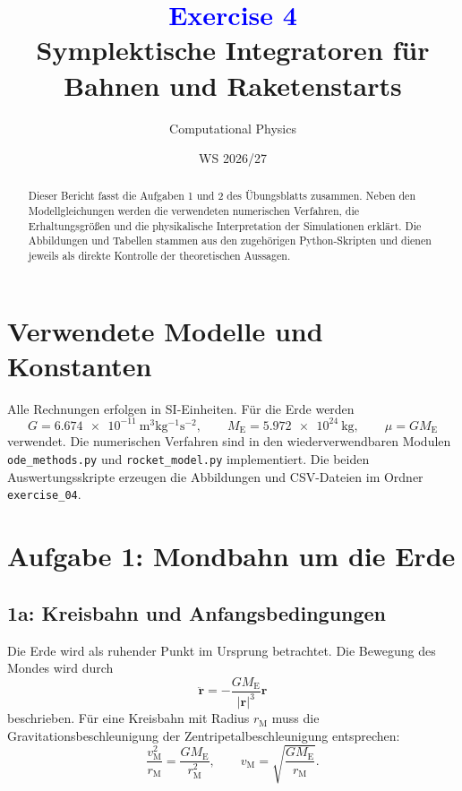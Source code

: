\documentclass[11pt,a4paper]{article}
\title{\textcolor{blue}{Exercise 4}\\[0.35em]
\large Symplektische Integratoren für Bahnen und Raketenstarts}
\author{Computational Physics}
\date{WS 2026/27}
\newcommand{\vect}[1]{\boldsymbol{#1}}
\newcommand{\code}[1]{\texttt{#1}}
\begin{document}
\maketitle
\thispagestyle{empty}

\begin{abstract}
Dieser Bericht fasst die Aufgaben 1 und 2 des Übungsblatts zusammen. Neben den
Modellgleichungen werden die verwendeten numerischen Verfahren, die
Erhaltungsgrößen und die physikalische Interpretation der Simulationen
erklärt. Die Abbildungen und Tabellen stammen aus den zugehörigen
Python-Skripten und dienen jeweils als direkte Kontrolle der theoretischen
Aussagen.
\end{abstract}

\tableofcontents
\newpage

\section{Verwendete Modelle und Konstanten}

Alle Rechnungen erfolgen in SI-Einheiten. Für die Erde werden
\[
G=\SI{6.674e-11}{\meter^3\kilogram^{-1}\second^{-2}},
\qquad
M_{\mathrm E}=\SI{5.972e24}{\kilogram},
\qquad
\mu=GM_{\mathrm E}
\]
verwendet. Die numerischen Verfahren sind in den wiederverwendbaren Modulen
\code{ode\_methods.py} und \code{rocket\_model.py} implementiert. Die beiden
Auswertungsskripte erzeugen die Abbildungen und CSV-Dateien im Ordner
\code{exercise\_04}.

\section{Aufgabe 1: Mondbahn um die Erde}

\subsection{1a: Kreisbahn und Anfangsbedingungen}

Die Erde wird als ruhender Punkt im Ursprung betrachtet. Die Bewegung des
Mondes wird durch
\begin{equation}
  \ddot{\vect r}
  =-\frac{GM_{\mathrm E}}{\lvert\vect r\rvert^3}\vect r
\end{equation}
beschrieben. Für eine Kreisbahn mit Radius $r_{\mathrm M}$ muss die
Gravitationsbeschleunigung der Zentripetalbeschleunigung entsprechen:
\begin{equation}
  \frac{v_{\mathrm M}^2}{r_{\mathrm M}}
  =\frac{GM_{\mathrm E}}{r_{\mathrm M}^2},
  \qquad
  v_{\mathrm M}=\sqrt{\frac{GM_{\mathrm E}}{r_{\mathrm M}}}.
\end{equation}
\end{document}
